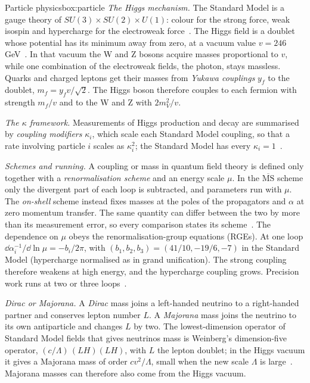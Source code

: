 \begin{primer}{Particle physics}{box:particle}
\setlength{\parskip}{3pt plus 1pt}%
\emph{The Higgs mechanism.} The Standard Model is a gauge theory of $SU(3)\times SU(2)\times U(1)$: colour for the strong force, weak isospin
and hypercharge for the electroweak force~\cite{glashow,weinberg67,salam}. The Higgs field is a doublet whose potential has its minimum
away from zero, at a vacuum value $v=246$\,GeV~\cite{higgs64,be64}. In that vacuum the W and Z bosons acquire masses proportional to $v$,
while one combination of the electroweak fields, the photon, stays massless. Quarks and charged leptons get their masses from
\emph{Yukawa couplings} $y_f$ to the doublet, $m_f=y_fv/\sqrt2$. The Higgs boson therefore couples to each fermion with strength $m_f/v$
and to the W and Z with $2m_V^2/v$.

\emph{The $\kappa$ framework.} Measurements of Higgs production and decay are summarised by \emph{coupling modifiers} $\kappa_i$, which
scale each Standard Model coupling, so that a rate involving particle $i$ scales as $\kappa_i^2$; the Standard Model has every
$\kappa_i=1$~\cite{david2012}.

\emph{Schemes and running.} A coupling or mass in quantum field theory is defined only together with a \emph{renormalisation scheme} and
an energy scale $\mu$. In the $\overline{\text{MS}}$ scheme only the divergent part of each loop is subtracted, and parameters run with
$\mu$. The \emph{on-shell} scheme instead fixes masses at the poles of the propagators and $\alpha$ at zero momentum transfer. The same
quantity can differ between the two by more than its measurement error, so every comparison states its scheme~\cite{erler2017,navas2024}.
The dependence on $\mu$ obeys the renormalisation-group equations (RGEs). At one loop
$\dd\alpha_i^{-1}/\dd\ln\mu=-b_i/2\pi$, with $(b_1,b_2,b_3)=(41/10,-19/6,-7)$ in the Standard Model (hypercharge normalised as in grand
unification). The strong coupling therefore weakens at high energy, and the hypercharge coupling grows. Precision work runs at two or
three loops~\cite{buttazzo2013}.

\emph{Dirac or Majorana.} A \emph{Dirac} mass joins a left-handed neutrino to a right-handed partner and conserves lepton number $L$. A
\emph{Majorana} mass joins the neutrino to its own antiparticle and changes $L$ by two. The lowest-dimension operator of Standard Model
fields that gives neutrinos mass is Weinberg's dimension-five operator, $(c/\Lambda)\,(LH)(LH)$, with $L$ the lepton doublet; in the Higgs
vacuum it gives a Majorana mass of order $cv^2/\Lambda$, small when the new scale $\Lambda$ is large~\cite{weinberg1979}. Majorana masses
can therefore also come from the Higgs vacuum.


\end{primer}

